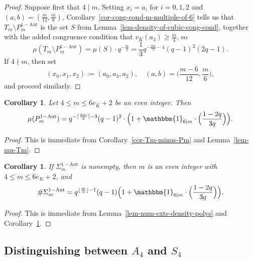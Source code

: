 \documentclass[11pt]{amsart}
\theoremstyle{theorem}
\newtheorem{corollary}[theorem]{Corollary}
\theoremstyle{example}
\theoremstyle{definition}
\numberwithin{theorem}{section}
\numberwithin{theorem}{section}
\newcommand{\oneaut}{\mathrm{1-Aut}}
\begin{document}
\begin{proof}    
    Suppose first that $4 \mid m$. Setting $x_i = a_i$ for $i=0,1,2$ and $(a,b) = (\frac{m}{12}, \frac{m}{6})$, Corollary~\ref{cor-cong-cond-m-multiple-of-6} tells us that $T_m\setminus P_m^{\oneaut}$ is the set $S$ from Lemma~\ref{lem-density-of-cubic-cong-cond}, together with the added congruence condition that $v_K(a_3) \geq \frac{m}{4}$, so 
    $$
    \mu(T_m\setminus P_m^{\oneaut}) = \mu(S)\cdot q^{- \frac{m}{4}} = \frac{1}{3}q^{-\frac{2m}{3} - 4}(q-1)^2(2q-1).
    $$ 
    If $4 \nmid m$, then set 
    $$
    (x_0,x_1,x_2) := (a_0, a_3, a_2),\quad (a,b) = \Big(\frac{m-6}{12}, \frac{m}{6}\Big),
    $$
    and proceed similarly. 
\end{proof}
\begin{corollary}
    \label{cor-mu-Pm}
    Let $4 \leq m \leq 6e_K + 2$ be an even integer. Then 
    $$
    \mu(P_m^{\oneaut}) = q^{ - \lceil \frac{2m}{3}\rceil - 3}(q-1)^2 \cdot \Big(1 + \mathbbm{1}_{6 \mid m}\cdot \Big(\frac{1 - 2q}{3q}\Big)\Big).
    $$
\end{corollary}
\begin{proof}
    This is immediate from Corollary~\ref{cor-Tm-minus-Pm} and Lemma~\ref{lem-mu-Tm}.
\end{proof}
\begin{corollary}
    \label{cor-size-of-Sigma-1-m}
    If $\Sigma_m^{\oneaut}$ is nonempty, then $m$ is an even integer with $4 \leq m \leq 6e_K + 2$, and 
    $$
    \#\Sigma_m^{\oneaut} = q^{\lfloor\frac{m}{3}\rfloor - 1}(q-1)\Big(1 + \mathbbm{1}_{6 \mid m}\cdot \Big(\frac{1 - 2q}{3q}\Big)\Big).
    $$
\end{corollary}
\begin{proof}
    This is immediate from Lemma~\ref{lem-num-exts-density-polys} and Corollary~\ref{cor-mu-Pm}.
\end{proof}

\subsection{Distinguishing between $A_4$ and $S_4$}
\end{document}
